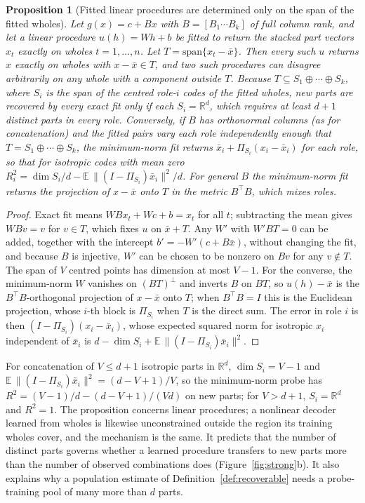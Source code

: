 \documentclass[10pt]{article}
\theoremstyle{plain}
\newtheorem{proposition}{Proposition}
\theoremstyle{remark}
\newcommand{\R}{\mathbb{R}}
\begin{document}
\begin{proposition}[Fitted linear procedures are determined only on the span of the fitted wholes]
\label{prop:span}
Let $g(x) = c + Bx$ with $B = [B_1 \cdots B_k]$ of full column rank, and let a linear procedure $u(h) = Wh + b$ be fitted to return the stacked part vectors $x_t$ exactly on wholes $t = 1, \ldots, n$. Let $T = \mathrm{span}\{x_t - \bar{x}\}$. Then every such $u$ returns $x$ exactly on wholes with $x - \bar{x} \in T$, and two such procedures can disagree arbitrarily on any whole with a component outside $T$. Because $T \subseteq S_1 \oplus \cdots \oplus S_k$, where $S_i$ is the span of the centred role-$i$ codes of the fitted wholes, new parts are recovered by every exact fit only if each $S_i = \R^d$, which requires at least $d + 1$ distinct parts in every role. Conversely, if $B$ has orthonormal columns (as for concatenation) and the fitted pairs vary each role independently enough that $T = S_1 \oplus \cdots \oplus S_k$, the minimum-norm fit returns $\bar{x}_i + \Pi_{S_i}(x_i - \bar{x}_i)$ for each role, so that for isotropic codes with mean zero $R^2_i = \dim S_i/d - \mathbb{E}\,\lVert (I - \Pi_{S_i})\bar{x}_i \rVert^2/d$. For general $B$ the minimum-norm fit returns the projection of $x - \bar{x}$ onto $T$ in the metric $B^{\top}B$, which mixes roles.
\end{proposition}

\begin{proof}
Exact fit means $WBx_t + Wc + b = x_t$ for all $t$; subtracting the mean gives $WBv = v$ for $v \in T$, which fixes $u$ on $\bar{x} + T$. Any $W'$ with $W'BT = 0$ can be added, together with the intercept $b' = -W'(c + B\bar{x})$, without changing the fit, and because $B$ is injective, $W'$ can be chosen to be nonzero on $B v$ for any $v \notin T$. The span of $V$ centred points has dimension at most $V - 1$. For the converse, the minimum-norm $W$ vanishes on $(BT)^{\perp}$ and inverts $B$ on $BT$, so $u(h) - \bar{x}$ is the $B^{\top}B$-orthogonal projection of $x - \bar{x}$ onto $T$; when $B^{\top}B = I$ this is the Euclidean projection, whose $i$-th block is $\Pi_{S_i}$ when $T$ is the direct sum. The error in role $i$ is then $(I - \Pi_{S_i})(x_i - \bar{x}_i)$, whose expected squared norm for isotropic $x_i$ independent of $\bar{x}_i$ is $d - \dim S_i + \mathbb{E}\,\lVert (I - \Pi_{S_i})\bar{x}_i \rVert^2$.
\end{proof}

\noindent
For concatenation of $V \le d + 1$ isotropic parts in $\R^d$, $\dim S_i = V - 1$ and $\mathbb{E}\,\lVert(I - \Pi_{S_i})\bar{x}_i\rVert^2 = (d - V + 1)/V$, so the minimum-norm probe has $R^2 = (V-1)/d - (d - V + 1)/(Vd)$ on new parts; for $V > d + 1$, $S_i = \R^d$ and $R^2 = 1$. The proposition concerns linear procedures; a nonlinear decoder learned from wholes is likewise unconstrained outside the region its training wholes cover, and the mechanism is the same. It predicts that the number of distinct parts governs whether a learned procedure transfers to new parts more than the number of observed combinations does (Figure~\ref{fig:strong}b). It also explains why a population estimate of Definition~\ref{def:recoverable} needs a probe-training pool of many more than $d$ parts.
\end{document}
